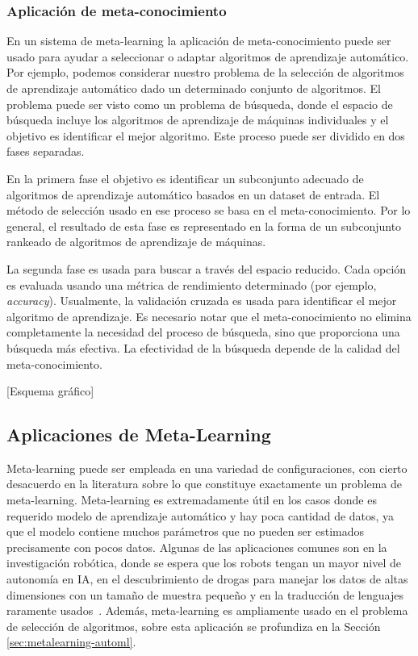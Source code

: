 \subsubsection{Aplicación de meta-conocimiento}

En un sistema de meta-learning la aplicación de meta-conocimiento puede ser usado para ayudar a seleccionar o adaptar algoritmos de aprendizaje automático. Por ejemplo, podemos considerar nuestro problema de la selección de algoritmos de aprendizaje automático dado un determinado conjunto de algoritmos. El problema puede ser visto como un problema de búsqueda, donde el espacio de búsqueda incluye los algoritmos de aprendizaje de máquinas individuales y el objetivo es identificar el mejor algoritmo. Este proceso puede ser dividido en dos fases separadas.

En la primera fase el objetivo es identificar un subconjunto adecuado de algoritmos de aprendizaje automático basados en un dataset de entrada. El método de selección usado en ese proceso se basa en el meta-conocimiento. Por lo general, el resultado de esta fase es representado en la forma de un subconjunto rankeado de algoritmos de aprendizaje de máquinas.

La segunda fase es usada para buscar a través del espacio reducido. Cada opción es evaluada usando una métrica de rendimiento determinado (por ejemplo, \textit{accuracy}). Usualmente, la validación cruzada es usada para identificar el mejor algoritmo de aprendizaje. Es necesario notar que el meta-conocimiento no elimina completamente la necesidad del proceso de búsqueda, sino que proporciona una búsqueda más efectiva. La efectividad de la búsqueda depende de la calidad del meta-conocimiento.

[Esquema gráfico]

\subsection{Aplicaciones de Meta-Learning}\label{subsec:mtl_aplications}

Meta-learning puede ser empleada en una variedad de configuraciones, con cierto desacuerdo en la literatura sobre lo que constituye exactamente un problema de meta-learning. Meta-learning es extremadamente útil en los casos donde es requerido modelo de aprendizaje automático y hay poca cantidad de datos, ya que el modelo contiene muchos parámetros que no pueden ser estimados precisamente con pocos datos. Algunas de las aplicaciones comunes son en la investigación robótica, donde se espera que los robots tengan un mayor nivel de autonomía en IA, en el descubrimiento de drogas para manejar los datos de altas dimensiones con un tamaño de muestra pequeño y en la traducción de lenguajes raramente usados~\cite{peng2020comprehensive}. Además, meta-learning es ampliamente usado en el problema de selección de algoritmos, sobre esta aplicación se profundiza en la Sección \ref{sec:metalearning-automl}.


